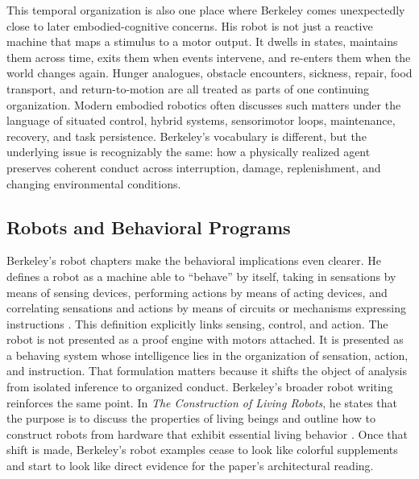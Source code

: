 \documentclass[11pt]{article}
\begin{document}
This temporal organization is also one place where Berkeley comes unexpectedly close to later embodied-cognitive concerns. His robot is not just a reactive machine that maps a stimulus to a motor output. It dwells in states, maintains them across time, exits them when events intervene, and re-enters them when the world changes again. Hunger analogues, obstacle encounters, sickness, repair, food transport, and return-to-motion are all treated as parts of one continuing organization. Modern embodied robotics often discusses such matters under the language of situated control, hybrid systems, sensorimotor loops, maintenance, recovery, and task persistence. Berkeley's vocabulary is different, but the underlying issue is recognizably the same: how a physically realized agent preserves coherent conduct across interruption, damage, replenishment, and changing environmental conditions.

\subsection*{Robots and Behavioral Programs}

Berkeley's robot chapters make the behavioral implications even clearer. He defines a robot as a machine able to ``behave'' by itself, taking in sensations by means of sensing devices, performing actions by means of acting devices, and correlating sensations and actions by means of circuits or mechanisms expressing instructions \citep[pp.~177--178]{berkeley1959symbolic}. This definition explicitly links sensing, control, and action. The robot is not presented as a proof engine with motors attached. It is presented as a behaving system whose intelligence lies in the organization of sensation, action, and instruction. That formulation matters because it shifts the object of analysis from isolated inference to organized conduct. Berkeley's broader robot writing reinforces the same point. In \emph{The Construction of Living Robots}, he states that the purpose is to discuss the properties of living beings and outline how to construct robots from hardware that exhibit essential living behavior \citep{berkeley1952livingrobots}. Once that shift is made, Berkeley's robot examples cease to look like colorful supplements and start to look like direct evidence for the paper's architectural reading.
\end{document}
